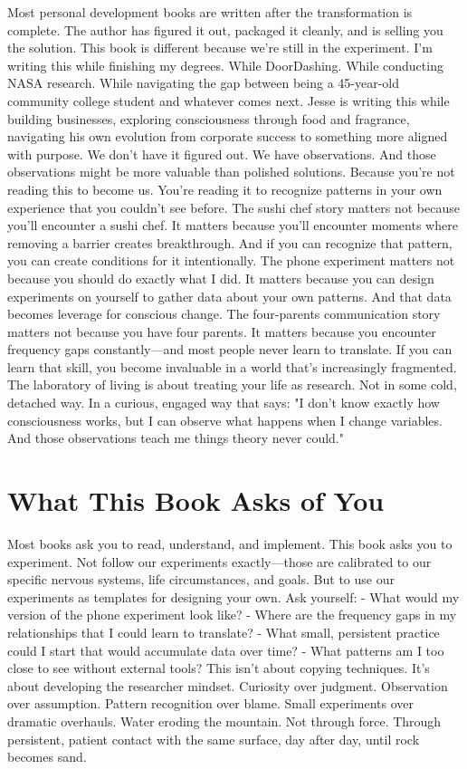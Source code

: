 \documentclass[12pt,openany]{book}
\begin{document}
Most personal development books are written after the transformation is complete. The author has figured it out, packaged it cleanly, and is selling you the solution.
This book is different because we're still in the experiment.
I'm writing this while finishing my degrees. While DoorDashing. While conducting NASA research. While navigating the gap between being a 45-year-old community college student and whatever comes next.
Jesse is writing this while building businesses, exploring consciousness through food and fragrance, navigating his own evolution from corporate success to something more aligned with purpose.
We don't have it figured out. We have observations.
And those observations might be more valuable than polished solutions. Because you're not reading this to become us. You're reading it to recognize patterns in your own experience that you couldn't see before.
The sushi chef story matters not because you'll encounter a sushi chef. It matters because you'll encounter moments where removing a barrier creates breakthrough. And if you can recognize that pattern, you can create conditions for it intentionally.
The phone experiment matters not because you should do exactly what I did. It matters because you can design experiments on yourself to gather data about your own patterns. And that data becomes leverage for conscious change.
The four-parents communication story matters not because you have four parents. It matters because you encounter frequency gaps constantly—and most people never learn to translate. If you can learn that skill, you become invaluable in a world that's increasingly fragmented.
The laboratory of living is about treating your life as research.
Not in some cold, detached way. In a curious, engaged way that says: "I don't know exactly how consciousness works, but I can observe what happens when I change variables. And those observations teach me things theory never could."

\section{What This Book Asks of You}

Most books ask you to read, understand, and implement.
This book asks you to experiment.
Not follow our experiments exactly—those are calibrated to our specific nervous systems, life circumstances, and goals. But to use our experiments as templates for designing your own.
Ask yourself:
- What would my version of the phone experiment look like?
- Where are the frequency gaps in my relationships that I could learn to translate?
- What small, persistent practice could I start that would accumulate data over time?
- What patterns am I too close to see without external tools?
This isn't about copying techniques. It's about developing the researcher mindset.
Curiosity over judgment. Observation over assumption. Pattern recognition over blame. Small experiments over dramatic overhauls.
Water eroding the mountain.
Not through force. Through persistent, patient contact with the same surface, day after day, until rock becomes sand.
\end{document}
